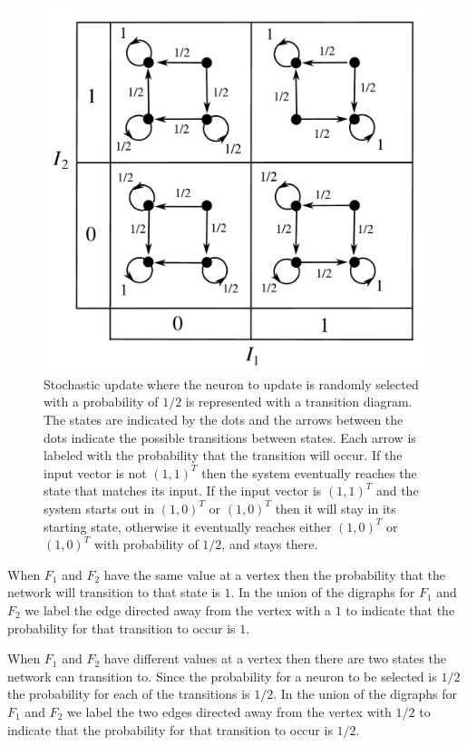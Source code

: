 \begin{figure}[ht]
\centering
\includegraphics[scale=0.45]{./images/TwoNodeHopfieldMarkov.pdf}
\caption{Stochastic update where the neuron to update is randomly selected with 
a probability of $1/2$ is represented with a transition diagram.  The states
are indicated by the dots and the arrows between the dots indicate the possible 
transitions between states.  Each arrow is labeled with the probability that the
transition will occur.  If the input vector is not $(1,1)^T$ then the system 
eventually reaches the state that matches its input.  If the input vector is 
$(1,1)^T$ and the system starts out in $(1,0)^T$ or $(1,0)^T$ then it will
stay in its starting state, otherwise it eventually reaches either $(1,0)^T$ or 
$(1,0)^T$ with probability of $1/2$, and stays there.} 
\label{F:TwoNodeHopfieldStochastic}  
\end{figure}

   When $F_1$ and $F_2$ have the same value at a vertex then the probability 
that the network will transition to that state is $1$.  In the union of the
digraphs for $F_1$ and $F_2$ we label the edge directed away from the vertex
with a $1$ to indicate that the probability for that transition to occur is 
$1$.  

   When $F_1$ and $F_2$ have different values at a vertex then there are two 
states the network can transition to.  Since the probability for a neuron to be
selected is $1/2$ the probability for each of the transitions is $1/2$.  In the 
union of the digraphs for $F_1$ and $F_2$ we label the two edges directed away 
from the vertex with $1/2$ to indicate that the probability for that transition 
to occur is $1/2$.

